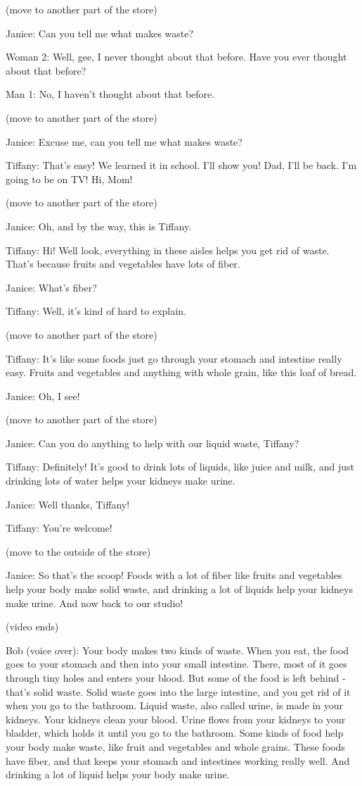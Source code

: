 (move to another part of the store)

Janice: Can you tell me what makes waste?

Woman 2: Well, gee, I never thought about that before. Have you ever thought about that before?

Man 1: No, I haven't thought about that before.

(move to another part of the store)

Janice: Excuse me, can you tell me what makes waste?

Tiffany: That's easy! We learned it in school. I'll show you! Dad, I'll be back. I'm going to be on TV! Hi, Mom!

(move to another part of the store)

Janice: Oh, and by the way, this is Tiffany.

Tiffany: Hi! Well look, everything in these aisles helps you get rid of waste. That's because fruits and vegetables have lots of fiber.

Janice: What's fiber?

Tiffany: Well, it's kind of hard to explain.

(move to another part of the store)

Tiffany: It's like some foods just go through your stomach and intestine really easy. Fruits and vegetables and anything with whole grain, like this loaf of bread.

Janice: Oh, I see!

(move to another part of the store)

Janice: Can you do anything to help with our liquid waste, Tiffany?

Tiffany: Definitely! It's good to drink lots of liquids, like juice and milk, and just drinking lots of water helps your kidneys make urine.

Janice: Well thanks, Tiffany!

Tiffany: You're welcome!

(move to the outside of the store)

Janice: So that's the scoop! Foods with a lot of fiber like fruits and vegetables help your body make solid waste, and drinking a lot of liquids help your kidneys make urine. And now back to our studio!

(video ends)

Bob (voice over): Your body makes two kinds of waste. When you eat, the food goes to your stomach and then into your small intestine. There, most of it goes through tiny holes and enters your blood. But some of the food is left behind - that's solid waste. Solid waste goes into the large intestine, and you get rid of it when you go to the bathroom. Liquid waste, also called urine, is made in your kidneys. Your kidneys clean your blood. Urine flows from your kidneys to your bladder, which holds it until you go to the bathroom. Some kinds of food help your body make waste, like fruit and vegetables and whole grains. These foods have fiber, and that keeps your stomach and intestines working really well. And drinking a lot of liquid helps your body make urine.

